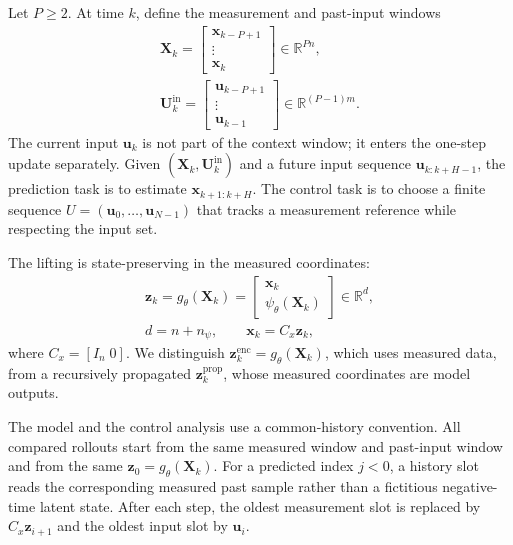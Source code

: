 ﻿\documentclass[journal]{IEEEtran}
\newcommand{\vx}{\mathbf{x}}
\newcommand{\vu}{\mathbf{u}}
\newcommand{\vz}{\mathbf{z}}
\newcommand{\mU}{\mathbf{U}}
\newcommand{\mX}{\mathbf{X}}
\newcommand{\R}{\mathbb{R}}
\begin{document}
Let $P\ge2$. At time $k$, define the measurement and past-input windows
\begin{equation}
    \begin{gathered}
    \mX_k=\begin{bmatrix}\vx_{k-P+1}\\ \vdots\\ \vx_k\end{bmatrix}\in\R^{Pn},\\
    \mU_k^{\mathrm{in}}=\begin{bmatrix}\vu_{k-P+1}\\ \vdots\\ \vu_{k-1}\end{bmatrix}\in\R^{(P-1)m}.
    \end{gathered}
    \label{eq:history_windows}
\end{equation}
The current input $\vu_k$ is not part of the context window; it enters the one-step update separately. Given $(\mX_k,\mU_k^{\mathrm{in}})$ and a future input sequence $\vu_{k:k+H-1}$, the prediction task is to estimate $\vx_{k+1:k+H}$. The control task is to choose a finite sequence $U=(\vu_0,\ldots,\vu_{N-1})$ that tracks a measurement reference while respecting the input set.

The lifting is state-preserving in the measured coordinates:
\begin{equation}
    \begin{gathered}
    \vz_k=g_\theta(\mX_k)=\begin{bmatrix}\vx_k\\ \psi_\theta(\mX_k)\end{bmatrix}\in\R^d,
    \\ d=n+n_\psi,
    \qquad \vx_k=C_x\vz_k,
    \end{gathered}
    \label{eq:state_preserving_lifting}
\end{equation}
where $C_x=[I_n\;0]$. We distinguish $\vz_k^{\mathrm{enc}}=g_\theta(\mX_k)$, which uses measured data, from a recursively propagated $\vz_k^{\mathrm{prop}}$, whose measured coordinates are model outputs.

The model and the control analysis use a common-history convention. All compared rollouts start from the same measured window and past-input window and from the same $\vz_0=g_\theta(\mX_k)$. For a predicted index $j<0$, a history slot reads the corresponding measured past sample rather than a fictitious negative-time latent state. After each step, the oldest measurement slot is replaced by $C_x\vz_{i+1}$ and the oldest input slot by $\vu_i$.
\end{document}
